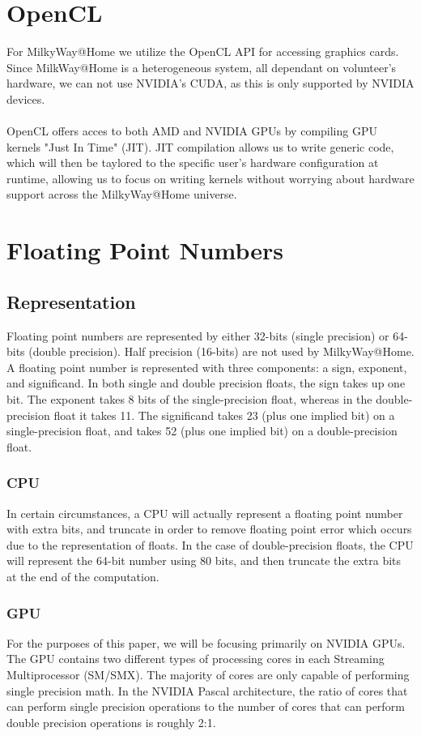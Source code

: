 \documentclass[fleqn,10pt]{SelfArx} %
\begin{document}
\section{OpenCL}
For MilkyWay@Home we utilize the OpenCL API for accessing graphics cards. Since MilkWay@Home is a heterogeneous system, all dependant on volunteer's hardware, we can not use NVIDIA's CUDA, as this is only supported by NVIDIA devices.\\~\\
OpenCL offers acces to both AMD and NVIDIA GPUs by compiling GPU kernels "Just In Time" (JIT). JIT compilation allows us to write generic code, which will then be taylored to the specific user's hardware configuration at runtime, allowing us to focus on writing kernels without worrying about hardware support across the MilkyWay@Home universe.

\section{Floating Point Numbers}
    \subsection{Representation}
    Floating point numbers are represented by either 32-bits (single precision) or 64-bits (double precision). Half precision (16-bits) are not used by MilkyWay@Home. A floating point number is represented with three components: a sign, exponent, and significand. In both single and double precision floats, the sign takes up one bit. The exponent takes 8 bits of the single-precision float, whereas in the double-precision float it takes 11. The significand takes 23 (plus one implied bit) on a single-precision float, and takes 52 (plus one implied bit) on a double-precision float.
        \subsubsection{CPU}
        In certain circumstances, a CPU will actually represent a floating point number with extra bits, and truncate in order to remove floating point error which occurs due to the representation of floats. In the case of double-precision floats, the CPU will represent the 64-bit number using 80 bits, and then truncate the extra bits at the end of the computation.
        \subsubsection{GPU}
        For the purposes of this paper, we will be focusing primarily on NVIDIA GPUs. The GPU contains two different types of processing cores in each Streaming Multiprocessor (SM/SMX). The majority of cores are only capable of performing single precision math. In the NVIDIA Pascal architecture, the ratio of cores that can perform single precision operations to the number of cores that can perform double precision operations is roughly 2:1. 
\end{document}
